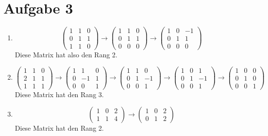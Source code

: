 \documentclass{article}
\begin{document}
    \section*{Aufgabe 3}
    \begin{enumerate}
        \item $$\begin{pmatrix}1 & 1 & 0\\ 0 & 1 & 1 \\ 1 & 1 & 0\end{pmatrix} \to \begin{pmatrix}1 & 1 & 0\\ 0 & 1 & 1 \\ 0 & 0 & 0\end{pmatrix} \to \begin{pmatrix}1 & 0 & -1\\ 0 & 1 & 1 \\ 0 & 0 & 0\end{pmatrix}$$ Diese Matrix hat also den Rang 2.
        \item $$\begin{pmatrix}1 & 1 & 0\\ 2 & 1 & 1 \\ 1 & 1 & 1\end{pmatrix} \to \begin{pmatrix}1 & 1 & 0\\ 0 & -1 & 1 \\ 0 & 0 & 1\end{pmatrix} \to \begin{pmatrix}1 & 1 & 0\\ 0 & 1 & -1 \\ 0 & 0 & 1\end{pmatrix}\to \begin{pmatrix}1 & 0 & 1\\ 0 & 1 & -1 \\ 0 & 0 & 1\end{pmatrix} \to \begin{pmatrix}1 & 0 & 0\\ 0 & 1 & 0 \\ 0 & 0 & 1\end{pmatrix}$$ Diese Matrix hat den Rang 3.
        \item $$\begin{pmatrix}1 & 0 & 2\\ 1 & 1 & 4\end{pmatrix} \to\begin{pmatrix}1 & 0 & 2\\ 0 & 1 & 2\end{pmatrix}$$ Diese Matrix hat den Rang 2.

\end{enumerate}
\end{document}

